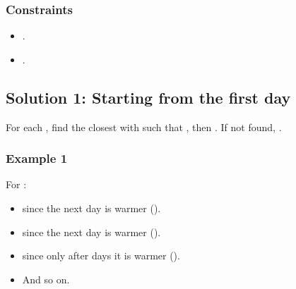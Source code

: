 \documentclass[letterpaper,12pt,english]{book}
\begin{document}
\subsubsection{Constraints}
\label{\detokenize{Array/01_ARR_739_Daily_Temperatures:constraints}}\begin{itemize}
\item {} 
\sphinxAtStartPar
{}.

\item {} 
\sphinxAtStartPar
{}.

\end{itemize}


\subsection{Solution 1: Starting from the first day}
\label{\detokenize{Array/01_ARR_739_Daily_Temperatures:solution-1-starting-from-the-first-day}}
\sphinxAtStartPar
For each , find the closest  with  such that , then . If not found, .


\subsubsection{Example 1}
\label{\detokenize{Array/01_ARR_739_Daily_Temperatures:id1}}
\sphinxAtStartPar
For :
\begin{itemize}
\item {} 
\sphinxAtStartPar
{} since the next day is warmer ().

\item {} 
\sphinxAtStartPar
{} since the next day is warmer ().

\item {} 
\sphinxAtStartPar
{} since only after  days it is warmer ().

\item {} 
\sphinxAtStartPar
And so on.

\end{itemize}
\end{document}
